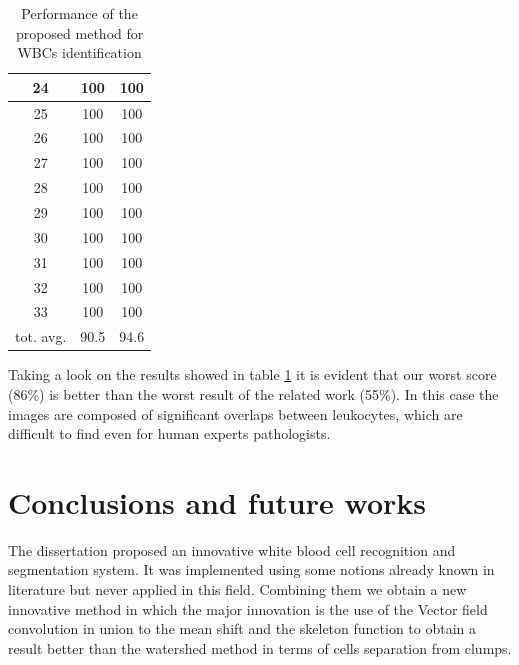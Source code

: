 \begin{table}
\begin{tabular}{|c|c|c|}
\hline
24 &  100 & 100 \\ 
\hline
25 &  100 & 100 \\ 
\hline
26 &  100 & 100 \\ 
\hline
27 &  100 & 100 \\ 
\hline
28 &  100 & 100 \\ 
\hline
29 &  100 & 100 \\ 
\hline
30 &  100 & 100 \\ 
\hline
31 &  100 & 100 \\ 
\hline
32 &  100 & 100 \\ 
\hline
33 &  100 & 100 \\
\hline
\hline
tot. avg. &  90.5 & 94.6 \\
\hline
\end{tabular} 
\caption{Performance of the proposed method for WBCs identification}
\label{resulttab}
\end{table}
Taking a look on the results showed in table \ref{resulttab} it is evident that our worst score (86\%) is better than the worst result of the related work (55\%). In this case the images are composed of significant overlaps between leukocytes, which are difficult to find even for human experts pathologists.




\section{Conclusions and future works}
The dissertation proposed an innovative white blood cell recognition and segmentation system. It was implemented using some notions already known in literature but never applied in this field. Combining them we obtain a new innovative method in which the major innovation is the use of the Vector field convolution in union to the mean shift and the skeleton function to obtain a result better than the watershed method in terms of cells separation from clumps.

\bigskip

